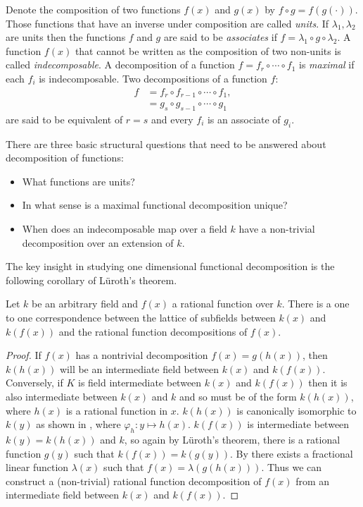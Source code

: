Denote the composition of two functions $f(x)$ and $g(x)$ by $f \circ
g = f(g(\cdot))$.  Those functions that have an inverse under
composition are called {\em units\/}.  If $\lambda_1, \lambda_2$ are
units then the functions $f$ and $g$ are said to be {\em associates}
if $f = \lambda_1 \circ g \circ \lambda_2$.  A function $f(x)$ that
cannot be written as the composition of two non-units is called {\em
indecomposable\/}. A decomposition of a function $f = f_r \circ \cdots
\circ f_1$ is {\em maximal} if each $f_i$ is indecomposable.  Two
decompositions of a function $f$:
\[
\begin{aligned}
f & = f_r \circ f_{r-1} \circ \cdots \circ f_1, \\
  & = g_s \circ g_{s-1} \circ \cdots \circ g_1 
\end{aligned}
\]
are said to be equivalent of $r = s$ and every $f_i$ is an associate of
$g_i$. 

There are three basic structural questions that need to be answered
about decomposition of functions:
\begin{itemize}
\item What functions are units?
\item In what sense is a maximal functional decomposition unique?
\item When does an indecomposable map over a field $k$ have a
non-trivial decomposition over an extension of $k$.
\end{itemize}

\medskip
The key insight in studying one dimensional functional decomposition
is the following corollary of L\"u\-roth's theorem.

\begin{proposition}
\label{Field:Decomp:Corres:Prop}
Let $k$ be an arbitrary field and $f(x)$ a rational function over $k$.
There is a one to one correspondence between the lattice of subfields
between $k(x)$ and $k(f(x))$ and the rational function decompositions of
$f(x)$. 
\end{proposition}

\begin{proof}
If $f(x)$ has a nontrivial decomposition $f(x) = g(h(x))$, then
$k(h(x))$ will be an intermediate field between $k(x)$ and $k(f(x))$.
Conversely, if $K$ is field intermediate between $k(x)$ and $k(f(x))$
then it is also intermediate between $k(x)$ and $k$ and so must be of
the form $k(h(x))$, where $h(x)$ is a rational function in $x$.
$k(h(x))$ is canonically isomorphic to $k(y)$ as shown in
, where $\varphi_h: y \mapsto h(x)$.
$k(f(x))$ is intermediate between $k(y) = k(h(x))$ and $k$, so again
by L\"uroth's theorem, there is a rational function $g(y)$ such that
$k(f(x)) = k(g(y))$.  By  there exists
a fractional linear function $\lambda(x)$ such that $f(x) = \lambda(g(h(x)))$.
Thus we can construct a (non-trivial) rational function decomposition
of $f(x)$ from an intermediate field between $k(x)$ and $k(f(x))$.
\end{proof}

